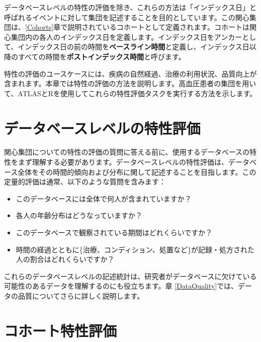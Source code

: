 \documentclass[
  11pt]{book}
\providecommand{\tightlist}{%
  \setlength{\itemsep}{0pt}\setlength{\parskip}{0pt}}
\theoremstyle{definition}
\theoremstyle{definition}
\theoremstyle{definition}
\theoremstyle{definition}
\theoremstyle{remark}
\begin{document}
データベースレベルの特性の評価を除き、これらの方法は「インデックス日」と呼ばれるイベントに対して集団を記述することを目的としています。この関心集団は、\ref{Cohorts}章で説明されているコホートとして定義されます。コホートは関心集団内の各人のインデックス日を定義します。インデックス日をアンカーとして、インデックス日の前の時間を\textbf{ベースライン時間}と定義し、インデックス日以降のすべての時間を\textbf{ポストインデックス時間}と呼びます。

特性の評価のユースケースには、疾病の自然経過、治療の利用状況、品質向上が含まれます。本章では特性の評価の方法を説明します。高血圧患者の集団を用いて、ATLASとRを使用してこれらの特性評価タスクを実行する方法を示します。       

\section{データベースレベルの特性評価}\label{ux30c7ux30fcux30bfux30d9ux30fcux30b9ux30ecux30d9ux30ebux306eux7279ux6027ux8a55ux4fa1}

関心集団についての特性の評価の質問に答える前に、使用するデータベースの特性をまず理解する必要があります。データベースレベルの特性評価は、データベース全体をその時間的傾向および分布に関して記述することを目指します。この定量的評価は通常、以下のような質問を含みます：

\begin{itemize}
\tightlist
\item
  このデータベースには全体で何人が含まれていますか？
\item
  各人の年齢分布はどうなっていますか？
\item
  このデータベースで観察されている期間はどれくらいですか？
\item
  時間の経過とともに\{治療、コンディション、処置など\}が記録・処方された人の割合はどれくらいですか？
\end{itemize}

これらのデータベースレベルの記述統計は、研究者がデータベースに欠けている可能性のあるデータを理解するのにも役立ちます。章 \ref{DataQuality}では、データの品質についてさらに詳しく説明します。 

\section{コホート特性評価}\label{ux30b3ux30dbux30fcux30c8ux7279ux6027ux8a55ux4fa1}
\end{document}

